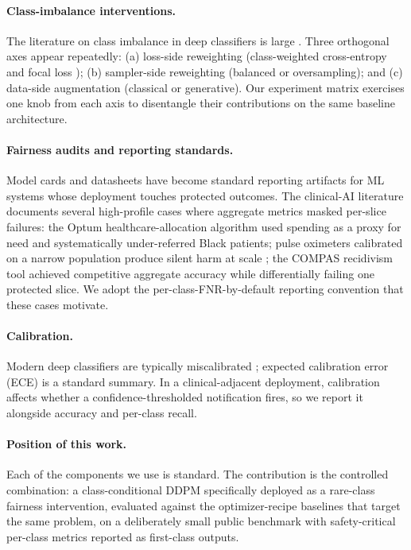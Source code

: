 \documentclass[10pt]{article}
\begin{document}
\paragraph{Class-imbalance interventions.} The literature on class imbalance in deep classifiers is large \citep{johnson2019survey}. Three orthogonal axes appear repeatedly: (a) loss-side reweighting (class-weighted cross-entropy and focal loss \citep{lin2017focal}); (b) sampler-side reweighting (balanced or oversampling); and (c) data-side augmentation (classical \citep{park2019specaugment,cubuk2019randaugment} or generative). Our experiment matrix exercises one knob from each axis to disentangle their contributions on the same baseline architecture.

\paragraph{Fairness audits and reporting standards.} Model cards \citep{mitchell2019model} and datasheets \citep{gebru2021datasheets} have become standard reporting artifacts for ML systems whose deployment touches protected outcomes. The clinical-AI literature documents several high-profile cases where aggregate metrics masked per-slice failures: the Optum healthcare-allocation algorithm \citep{obermeyer2019dissecting} used spending as a proxy for need and systematically under-referred Black patients; pulse oximeters calibrated on a narrow population produce silent harm at scale \citep{sjoding2020racial}; the COMPAS recidivism tool \citep{angwin2016machine} achieved competitive aggregate accuracy while differentially failing one protected slice. We adopt the per-class-FNR-by-default reporting convention that these cases motivate.

\paragraph{Calibration.} Modern deep classifiers are typically miscalibrated \citep{guo2017calibration}; expected calibration error (ECE) is a standard summary. In a clinical-adjacent deployment, calibration affects whether a confidence-thresholded notification fires, so we report it alongside accuracy and per-class recall.

\paragraph{Position of this work.} Each of the components we use is standard. The contribution is the controlled combination: a class-conditional DDPM specifically deployed as a rare-class fairness intervention, evaluated against the optimizer-recipe baselines that target the same problem, on a deliberately small public benchmark with safety-critical per-class metrics reported as first-class outputs.
\end{document}
